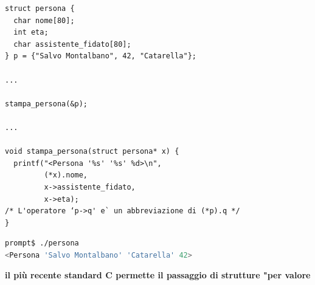 \documentclass[a4paper,12pt, oneside]{book}
\begin{document}
\begin{verbatim}
struct persona {
  char nome[80];
  int eta;
  char assistente_fidato[80];
} p = {"Salvo Montalbano", 42, "Catarella"};

...

stampa_persona(&p);

...

void stampa_persona(struct persona* x) {
  printf("<Persona '%s' '%s' %d>\n",
         (*x).nome,
         x->assistente_fidato,
         x->eta);
/* L'operatore ‘p->q' e` un abbreviazione di (*p).q */
}
\end{verbatim}
\begin{shaded}
\begin{lstlisting}[language=bash]
prompt$ ./persona
<Persona 'Salvo Montalbano' 'Catarella' 42>
\end{lstlisting}
\end{shaded}
\textbf{il più recente standard C permette il passaggio di strutture
"per valore}
\end{document}
